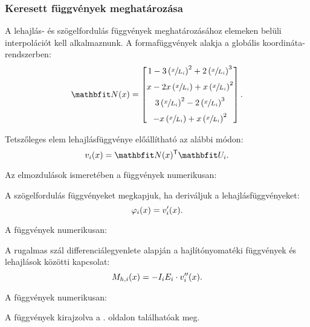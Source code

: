 \subsubsection{Keresett függvények meghatározása}

A lehajlás- és szögelfordulás függvények meghatározásához elemeken belüli
interpolációt kell alkalmaznunk. A formafüggvények alakja a globális
koordináta-rendszerben:
\begin{equation}
  \renewcommand\a{\left(\sfrac{x}{L_i}\right)}
  \rvec N(x) =
  \begin{bmatrix}
    1 - 3\a^2 + 2\a^3 \\[2mm]
    x - 2x\a + x\a^2  \\[2mm]
    3\a^2 - 2\a^3     \\[2mm]
    -x\a + x\a^2
  \end{bmatrix}
  \text.
  \label{eq:N-param}
\end{equation}

Tetszőleges elem lehajlásfüggvénye előállítható az alábbi módon:
\begin{equation}
  v_i(x) = \rvec N(x)^{\mathsf T} \rvec U_i
  \text.
  \label{eq:v-param}
\end{equation}

Az elmozdulások ismeretében a függvények numerikusan:


A szögelfordulás függvényeket megkapjuk, ha deriváljuk a lehajlásfüggvényeket:
\begin{equation}
  \varphi_i(x) = v_i'(x)
  \text.
  \label{eq:phi-param}
\end{equation}

A függvények numerikusan:


A rugalmas szál differenciálegyenlete alapján a hajlítónyomatéki függvények
és lehajlások közötti kapcsolat:
\begin{equation}
  M_{h,i}(x) = -I_i E_i \cdot v_i''(x)
  \text.
  \label{eq:Mh-param}
\end{equation}

A függvények numerikusan:

% 
A függvények kirajzolva a \pageref{fig:plot-v}. oldalon találhatóak meg.
